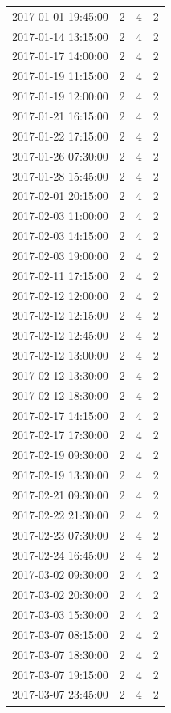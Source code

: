 \begin{tabular}{lrrr}
2017-01-01 19:45:00 & 2 & 4 & 2 \\
2017-01-14 13:15:00 & 2 & 4 & 2 \\
2017-01-17 14:00:00 & 2 & 4 & 2 \\
2017-01-19 11:15:00 & 2 & 4 & 2 \\
2017-01-19 12:00:00 & 2 & 4 & 2 \\
2017-01-21 16:15:00 & 2 & 4 & 2 \\
2017-01-22 17:15:00 & 2 & 4 & 2 \\
2017-01-26 07:30:00 & 2 & 4 & 2 \\
2017-01-28 15:45:00 & 2 & 4 & 2 \\
2017-02-01 20:15:00 & 2 & 4 & 2 \\
2017-02-03 11:00:00 & 2 & 4 & 2 \\
2017-02-03 14:15:00 & 2 & 4 & 2 \\
2017-02-03 19:00:00 & 2 & 4 & 2 \\
2017-02-11 17:15:00 & 2 & 4 & 2 \\
2017-02-12 12:00:00 & 2 & 4 & 2 \\
2017-02-12 12:15:00 & 2 & 4 & 2 \\
2017-02-12 12:45:00 & 2 & 4 & 2 \\
2017-02-12 13:00:00 & 2 & 4 & 2 \\
2017-02-12 13:30:00 & 2 & 4 & 2 \\
2017-02-12 18:30:00 & 2 & 4 & 2 \\
2017-02-17 14:15:00 & 2 & 4 & 2 \\
2017-02-17 17:30:00 & 2 & 4 & 2 \\
2017-02-19 09:30:00 & 2 & 4 & 2 \\
2017-02-19 13:30:00 & 2 & 4 & 2 \\
2017-02-21 09:30:00 & 2 & 4 & 2 \\
2017-02-22 21:30:00 & 2 & 4 & 2 \\
2017-02-23 07:30:00 & 2 & 4 & 2 \\
2017-02-24 16:45:00 & 2 & 4 & 2 \\
2017-03-02 09:30:00 & 2 & 4 & 2 \\
2017-03-02 20:30:00 & 2 & 4 & 2 \\
2017-03-03 15:30:00 & 2 & 4 & 2 \\
2017-03-07 08:15:00 & 2 & 4 & 2 \\
2017-03-07 18:30:00 & 2 & 4 & 2 \\
2017-03-07 19:15:00 & 2 & 4 & 2 \\
2017-03-07 23:45:00 & 2 & 4 & 2 \\

\end{tabular}
